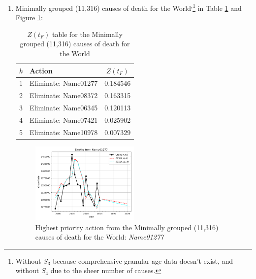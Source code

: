 \documentclass[12pt, a4paper, twocolumn]{article}
\begin{document}
\begin{enumerate}
  \item Minimally grouped (11,316) causes of death for the World\cite{whomortality}\textsuperscript{,}\footnote{\label{no_s3}Without $S_3$ because comprehensive granular age data doesn't exist, and without $S_4$ due to the sheer number of causes.} in Table \ref{table:ztable8} and Figure \ref{fig:k8}:
    \begin{table}[H]
      \centering
      \begin{tabular}{clc}
        \toprule
          $k$ & Action               & $Z(t_F)$ \\
        \midrule
          1   & Eliminate: Name01277 & 0.184546 \\
          2   & Eliminate: Name08372 & 0.163315 \\
          3   & Eliminate: Name06345 & 0.120113 \\
          4   & Eliminate: Name07421 & 0.025902 \\
          5   & Eliminate: Name10978 & 0.007329 \\
        \bottomrule
      \end{tabular}
      \caption{$Z(t_F)$ table for the Minimally grouped (11,316) causes of death for the World}
      \label{table:ztable8}
    \end{table}
    \begin{figure}[H]
      \centering
      \includegraphics[width=0.5\textwidth]{results/WORLD_ICD10_MINIMALLY_GROUPED/Name01277_ets.png}
      \caption{Highest priority action from the Minimally grouped (11,316) causes of death for the World: \textit{Name01277}}\label{fig:k8}
    \end{figure}
  

\end{enumerate}
\end{document}
